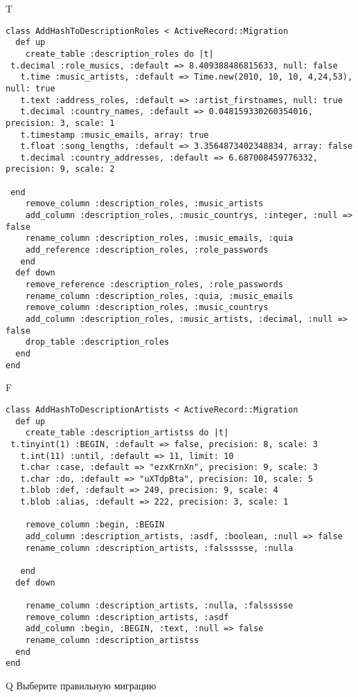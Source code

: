 T
\begin{verbatim}
class AddHashToDescriptionRoles < ActiveRecord::Migration
  def up
    create_table :description_roles do |t|
 t.decimal :role_musics, :default => 8.409388486815633, null: false
   t.time :music_artists, :default => Time.new(2010, 10, 10, 4,24,53), null: true
   t.text :address_roles, :default => :artist_firstnames, null: true
   t.decimal :country_names, :default => 0.048159330260354016, precision: 3, scale: 1
   t.timestamp :music_emails, array: true
   t.float :song_lengths, :default => 3.3564873402348834, array: false
   t.decimal :country_addresses, :default => 6.687008459776332, precision: 9, scale: 2

 end
    remove_column :description_roles, :music_artists
    add_column :description_roles, :music_countrys, :integer, :null => false
    rename_column :description_roles, :music_emails, :quia
    add_reference :description_roles, :role_passwords
   end
  def down
    remove_reference :description_roles, :role_passwords
    rename_column :description_roles, :quia, :music_emails
    remove_column :description_roles, :music_countrys
    add_column :description_roles, :music_artists, :decimal, :null => false
    drop_table :description_roles
  end
end
\end{verbatim}

F
\begin{verbatim}
class AddHashToDescriptionArtists < ActiveRecord::Migration
  def up
    create_table :description_artistss do |t| 
 t.tinyint(1) :BEGIN, :default => false, precision: 8, scale: 3
   t.int(11) :until, :default => 11, limit: 10
   t.char :case, :default => "ezxKrnXn", precision: 9, scale: 3
   t.char :do, :default => "uXTdpBta", precision: 10, scale: 5
   t.blob :def, :default => 249, precision: 9, scale: 4
   t.blob :alias, :default => 222, precision: 3, scale: 1

    remove_column :begin, :BEGIN
    add_column :description_artists, :asdf, :boolean, :null => false
    rename_column :description_artists, :falssssse, :nulla

   end
  def down

    rename_column :description_artists, :nulla, :falssssse
    remove_column :description_artists, :asdf
    add_column :begin, :BEGIN, :text, :null => false
    rename_column :description_artistss
  end
end
\end{verbatim}
Q
Выберите правильную миграцию

